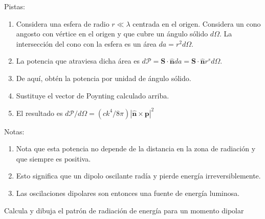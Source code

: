 \documentclass{exam}
\newenvironment{pistas}{\par\noindent Pistas:\begin{enumerate}} {\end{enumerate}}
\newenvironment{notas}{\par\noindent Notas:\begin{enumerate}} {\end{enumerate}}
\begin{document}
\begin{questions}
\begin{pistas}
  \item Considera una esfera de radio $r\ll\lambda$ centrada en el
    origen. Considera un cono angosto con vértice en el origen y que
    cubre un ángulo sólido $d\Omega$. La intersección del cono con la
    esfera es un área $da=r^2d\Omega$.
  \item La potencia que atraviesa dicha área es $d\mathcal P=
    \bm S\cdot\hat{\bm n}da=\bm S\cdot\hat{\bm n}r^s d\Omega$.
  \item De aquí, obtén la potencia por unidad de ángulo sólido.
  \item Sustituye el vector de Poynting calculado arriba.
  \item El resultado es $d\mathcal P/d\Omega=(ck^4/8\pi) |\hat{\bm n}\times\bm p|^2$
  \end{pistas}
  \begin{notas}
  \item Nota que esta potencia no depende de la distancia en la zona
    de radiación y que siempre es positiva.
  \item Esto significa que un dipolo oscilante radía y pierde energía
    irreversiblemente.
  \item Las oscilaciones dipolares son entonces una fuente de energía luminosa.
  \end{notas}
\question \label{u} Calcula y dibuja el patrón de radiación de energía
  para un momento dipolar
\end{questions}
\end{document}
